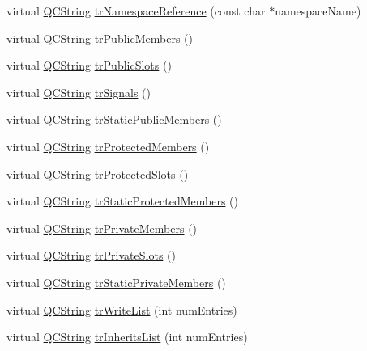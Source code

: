 \begin{DoxyCompactItemize}
\item 
virtual \hyperlink{class_q_c_string}{Q\+C\+String} \hyperlink{class_translator_danish_a1838cbd784bbcddf40e81c1555d1644b}{tr\+Namespace\+Reference} (const char $\ast$namespace\+Name)
\item 
virtual \hyperlink{class_q_c_string}{Q\+C\+String} \hyperlink{class_translator_danish_a17518dfc88db00cc4d8b11043f166e2c}{tr\+Public\+Members} ()
\item 
virtual \hyperlink{class_q_c_string}{Q\+C\+String} \hyperlink{class_translator_danish_a72bed46447c6bf7a55ce1ea5d4d3eafe}{tr\+Public\+Slots} ()
\item 
virtual \hyperlink{class_q_c_string}{Q\+C\+String} \hyperlink{class_translator_danish_aa46a321c75ba498ca06df96157420925}{tr\+Signals} ()
\item 
virtual \hyperlink{class_q_c_string}{Q\+C\+String} \hyperlink{class_translator_danish_a72dfd81f3244a82c31af4a00acc97dd3}{tr\+Static\+Public\+Members} ()
\item 
virtual \hyperlink{class_q_c_string}{Q\+C\+String} \hyperlink{class_translator_danish_a1c36a68a1434af62db7b7e450ef86909}{tr\+Protected\+Members} ()
\item 
virtual \hyperlink{class_q_c_string}{Q\+C\+String} \hyperlink{class_translator_danish_a63e6342e8ff2a623aa012ddc01489d12}{tr\+Protected\+Slots} ()
\item 
virtual \hyperlink{class_q_c_string}{Q\+C\+String} \hyperlink{class_translator_danish_a98a043616876ae3979cf60a4872393ef}{tr\+Static\+Protected\+Members} ()
\item 
virtual \hyperlink{class_q_c_string}{Q\+C\+String} \hyperlink{class_translator_danish_ac7b65ac3ceb609b9bd30675c220ac598}{tr\+Private\+Members} ()
\item 
virtual \hyperlink{class_q_c_string}{Q\+C\+String} \hyperlink{class_translator_danish_aa9876d4d21ef4d68afaed6abba935ecc}{tr\+Private\+Slots} ()
\item 
virtual \hyperlink{class_q_c_string}{Q\+C\+String} \hyperlink{class_translator_danish_a1a7cd0c6880109c581cc13d188877284}{tr\+Static\+Private\+Members} ()
\item 
virtual \hyperlink{class_q_c_string}{Q\+C\+String} \hyperlink{class_translator_danish_ae6dd9f8fb876f6a70629593a306af7cf}{tr\+Write\+List} (int num\+Entries)
\item 
virtual \hyperlink{class_q_c_string}{Q\+C\+String} \hyperlink{class_translator_danish_a7a2493c9703346cdf7f4667cd0ab00ba}{tr\+Inherits\+List} (int num\+Entries)
\item 

\end{DoxyCompactItemize}
